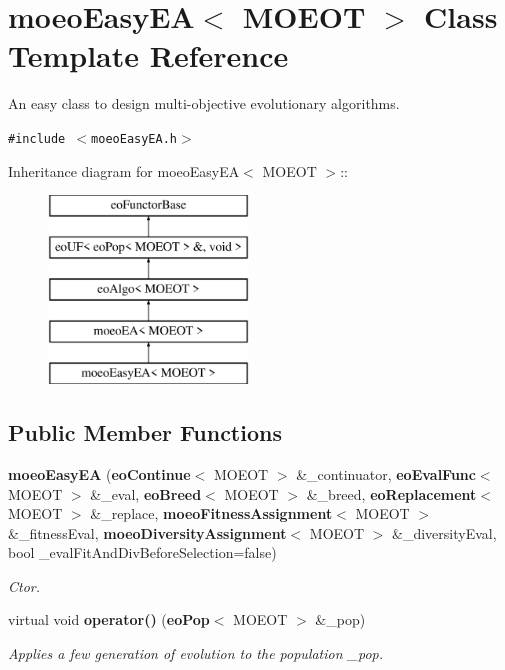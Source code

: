 \section{moeo\-Easy\-EA$<$ MOEOT $>$ Class Template Reference}
\label{classmoeoEasyEA}
An easy class to design multi-objective evolutionary algorithms.  


{\tt \#include $<$moeo\-Easy\-EA.h$>$}

Inheritance diagram for moeo\-Easy\-EA$<$ MOEOT $>$::\begin{figure}[H]
\begin{center}
\leavevmode
\includegraphics[height=5cm]{classmoeoEasyEA}
\end{center}
\end{figure}
\subsection*{Public Member Functions}
\begin{CompactItemize}
\item 
{\bf moeo\-Easy\-EA} ({\bf eo\-Continue}$<$ MOEOT $>$ \&\_\-continuator, {\bf eo\-Eval\-Func}$<$ MOEOT $>$ \&\_\-eval, {\bf eo\-Breed}$<$ MOEOT $>$ \&\_\-breed, {\bf eo\-Replacement}$<$ MOEOT $>$ \&\_\-replace, {\bf moeo\-Fitness\-Assignment}$<$ MOEOT $>$ \&\_\-fitness\-Eval, {\bf moeo\-Diversity\-Assignment}$<$ MOEOT $>$ \&\_\-diversity\-Eval, bool \_\-eval\-Fit\-And\-Div\-Before\-Selection=false)
\begin{CompactList}\small\item\em Ctor. \item\end{CompactList}\item 
virtual void {\bf operator()} ({\bf eo\-Pop}$<$ MOEOT $>$ \&\_\-pop)
\begin{CompactList}\small\item\em Applies a few generation of evolution to the population \_\-pop. \item\end{CompactList}\end{CompactItemize}

